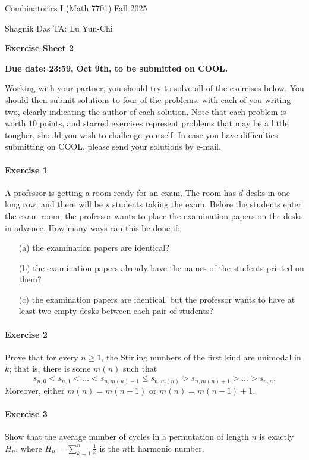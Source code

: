 \documentclass[a4paper,12pt]{article}
\newcommand{\courseTitle}{Combinatorics I (Math 7701)}
\newcommand{\semester}{Fall 2025}
\newcommand{\instructorA}{Shagnik Das}
\newcommand{\instructorB}{TA: Lu Yun-Chi}
\newcommand{\sheetNumber}{2}
\newcommand{\dueDate}{23:59, Oct 9th, to be submitted on COOL.}
\newcommand{\buildtitle}[4]{
\begin{flushleft}
{\large
#1
\hfill{}
#2
\par
#3
}
\end{flushleft}
\vskip 4pt
\begin{center}
{\large\bfseries#4\par}
\end{center}
\bigskip
}
\begin{document}
\buildtitle{\courseTitle{}}{\semester}{\instructorA{} \hfill \instructorB{}}{Exercise Sheet \sheetNumber{}}

\vspace{-0.2in}

\begin{center}

{\bf Due date: \dueDate{}}

\end{center}

\noindent Working with your partner, you should try to solve all of the exercises below. You should then submit solutions to four of the problems, with each of you writing two, clearly indicating the author of each solution. Note that each problem is worth $10$ points, and starred exercises represent problems that may be a little tougher, should you wish to challenge yourself. In case you have difficulties submitting on COOL, please send your solutions by e-mail.

\paragraph{Exercise 1}  A professor is getting a room ready for an exam.  The room has $d$ desks in one long row, and there will be $s$ students taking the exam.  Before the students enter the exam room, the professor wants to place the examination papers on the desks in advance.  How many ways can this be done if:
\begin{itemize}
	\item[(a)] the examination papers are identical?
	\item[(b)] the examination papers already have the names of the students printed on them?
	\item[(c)] the examination papers are identical, but the professor wants to have at least two empty desks between each pair of students?
\end{itemize}

\paragraph{Exercise 2}  Prove that for every $n \ge 1$, the Stirling numbers of the first kind are unimodal in $k$; that is, there is some $m(n)$ such that
\[ s_{n,0} < s_{n,1} < \hdots < s_{n,m(n)-1} \le s_{n,m(n)} > s_{n,m(n)+ 1} > \hdots > s_{n,n}. \]
Moreover, either $m(n) = m(n-1)$ or $m(n) = m(n-1) + 1$.

\paragraph{Exercise 3}  Show that the average number of cycles in a permutation of length $n$ is exactly $H_n$, where $H_n = \sum_{k=1}^{n} \frac{1}{k}$ is the $n$th harmonic number.
\vspace{-1em}
\end{document}
